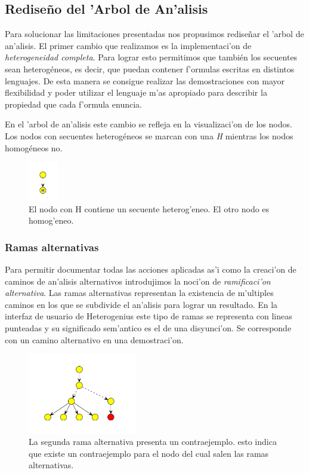 \subsection{Rediseño del 'Arbol de An'alisis}

Para solucionar las limitaciones presentadas nos propusimos rediseñar el 'arbol de an'alisis.
El primer cambio que realizamos es la implementaci'on de \emph{heterogeneidad completa}.
Para lograr esto permitimos que también los secuentes sean heterogéneos, es decir, que puedan contener f'ormulas escritas en distintos lenguajes. De esta manera se consigue realizar las demostraciones con mayor flexibilidad y poder utilizar el lenguaje m'as apropiado para describir la propiedad que cada f'ormula enuncia.

En el 'arbol de an'alisis este cambio se refleja en la visualizaci'on de los nodos. Los nodos con secuentes heterogéneos se marcan con una \textit{H} mientras los nodos homogéneos no.

\begin{figure}[tbh]
	\includegraphics[width=50px]{img/hetero_homo.png}
	\centering
	\caption{El nodo con H contiene un secuente heterog'eneo. El otro nodo es homog'eneo.}
\end{figure}


\subsubsection{Ramas alternativas}

Para permitir documentar todas las acciones aplicadas as'i como la creaci'on de caminos de an'alisis alternativos introdujimos la noci'on de \textit{ramificaci'on alternativa}.
Las ramas alternativas representan la existencia de m'ultiples caminos en los que se subdivide el an'alisis para lograr un resultado. En la interfaz de usuario de Heterogenius este tipo de ramas se representa con lineas punteadas y su significado sem'antico es el de una disyunci'on. Se corresponde con un camino alternativo en una demostraci'on.

\begin{figure}[htb]
	\includegraphics[width=180px]{img/ramas_alternativas_2.png}
	\centering
	\caption{La segunda rama alternativa presenta un contraejemplo. esto indica que existe un contraejemplo para el nodo del cual salen las ramas alternativas.}
        \label{alter1}
\end{figure}

